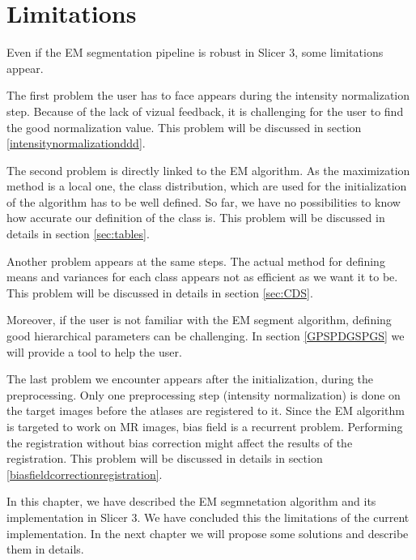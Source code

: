 \section{Limitations}\label{su:limitations}
Even if the EM segmentation pipeline is robust in Slicer 3, some limitations appear.
\par
The first problem the user has to face appears during the intensity normalization step. Because of the lack of vizual feedback, it is challenging for the user to find the good normalization value. This problem will be discussed in section \ref{intensitynormalizationddd}.
\par
The second problem is directly linked to the EM algorithm. As the maximization method is a local one, the class distribution, which are used for the initialization of the algorithm has to be well defined. So far, we have no possibilities to know how accurate our definition of the class is. This problem will be discussed in details in section \ref{sec:tables}.
\par
Another problem appears at the same steps. The actual method for defining means and variances for each class appears not as efficient as we want it to be. This problem will be discussed in details in section \ref{sec:CDS}.
\par
Moreover, if the user is not familiar with the EM segment algorithm, defining good hierarchical parameters can be challenging. In section \ref{GPSPDGSPGS} we will provide a tool to help the user.
\par 
The last problem we encounter appears after the initialization, during the preprocessing. Only one preprocessing  step (intensity normalization) is done on the target images before the atlases are registered to it. Since the EM algorithm is targeted to work on MR images, bias field is a recurrent problem. Performing the registration without bias correction might affect the results of the registration. This problem will be discussed in details in section \ref{biasfieldcorrectionregistration}.

%
\par
In this chapter, we have described the EM segmnetation algorithm and its implementation in Slicer 3. We have concluded this the limitations of the current implementation. In the next chapter we will propose some solutions and describe them in details.